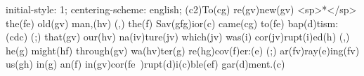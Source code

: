 initial-style: 1;
centering-scheme: english;
(c2)To(cg) re(gv)new(gv) <sp>*</sp> the(fe) old(gv) man,(hv) (,) the(f) Sav(gfg)ior(c) came(cg) to(fe) bap(d)tism:(cdc) (;) that(gv) our(hv) na(iv)ture(jv) which(jv) was(i) cor(jv)rupt(i)ed(h) (,) he(g) might(hf) through(gv) wa(hv)ter(g) re(hg)cov(f)er:(e) (;) ar(fv)ray(e)ing(fv) us(gh) in(g) an(f) in(gv)cor(fe~)rupt(d)i(c)ble(ef) gar(d)ment.(c)
